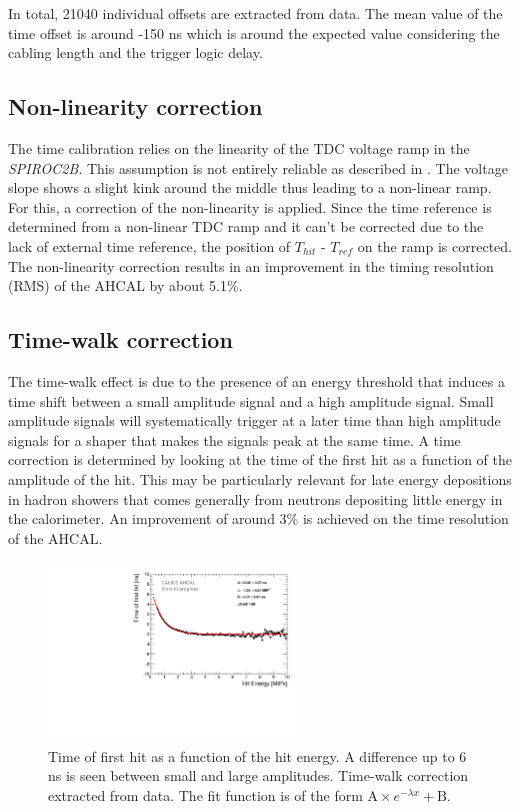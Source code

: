 In total, 21040 individual offsets are extracted from data. The mean value of the time offset is around -150 ns which is around the expected value considering the cabling length and the trigger logic delay.

\subsection{Non-linearity correction}

The time calibration relies on the linearity of the TDC voltage ramp in the \textit{SPIROC2B}. This assumption is not entirely reliable as described in \cite{Hartbrich2011, Brianne2012}. The voltage slope shows a slight kink around the middle thus leading to a non-linear ramp. For this, a correction of the non-linearity is applied. Since the time reference is determined from a non-linear TDC ramp and it can't be corrected due to the lack of external time reference, the position of $T_{hit}$ - $T_{ref}$ on the ramp is corrected. The non-linearity correction results in an improvement in the timing resolution (RMS) of the AHCAL by about 5.1\%.

\subsection{Time-walk correction}

The time-walk effect is due to the presence of an energy threshold that induces a time shift between a small amplitude signal and a high amplitude signal. Small amplitude signals will systematically trigger at a later time than high amplitude signals for a shaper that makes the signals peak at the same time. A time correction is determined by looking at the time of the first hit as a function of the amplitude of the hit. This may be particularly relevant for late energy depositions in hadron showers that comes generally from neutrons depositing little energy in the calorimeter. An improvement of around 3\% is achieved on the time resolution of the AHCAL.

\begin{figure}[htbp!]
	\centering
	\includegraphics[width=0.6\textwidth]{fig/TimeWalkProfile.pdf}
	\caption{Time of first hit as a function of the hit energy. A difference up to 6 ns is seen between small and large amplitudes. Time-walk correction extracted from data. The fit function is of the form $\text{A} \times e^{-\lambda{}x} + \text{B}$.}\label{fig:time_walk}
\end{figure}

